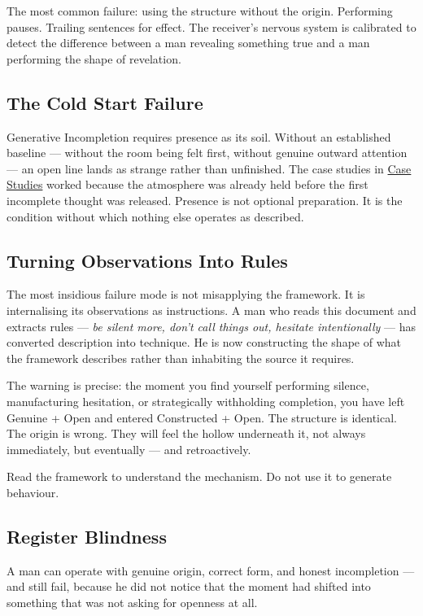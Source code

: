The most common failure: using the structure without the origin. Performing pauses. 
Trailing sentences for effect. The receiver's nervous system is calibrated to detect 
the difference between a man revealing something true and a man performing the shape of 
revelation.

\subsection{The Cold Start Failure}

Generative Incompletion requires presence as its soil. Without an established 
baseline --- without the room being felt first, without genuine outward attention --- an open 
line lands as strange rather than unfinished. The case studies in 
\hyperref[sec:case_studies]{Case Studies} worked because the atmosphere was 
already held before the first incomplete thought was released. 
Presence is not optional preparation. It is the condition without which nothing else 
operates as described.

\subsection{Turning Observations Into Rules}

The most insidious failure mode is not misapplying the framework. It is internalising its 
observations as instructions. A man who reads this document and extracts 
rules --- \textit{be silent more, don't call things out, hesitate intentionally} --- has 
converted description into technique. He is now constructing the shape of what the 
framework describes rather than inhabiting the source it requires.

The warning is precise: the moment you find yourself performing silence, 
manufacturing hesitation, or strategically withholding completion, you have left 
Genuine + Open and entered Constructed + Open. The structure is identical. 
The origin is wrong. They will feel the hollow underneath it, not always immediately, 
but eventually --- and retroactively.

Read the framework to understand the mechanism. Do not use it to generate behaviour.

\subsection{Register Blindness}

A man can operate with genuine origin, correct form, and honest incompletion --- and still fail, because he did not notice that the moment had shifted into something that was not asking for openness at all.

